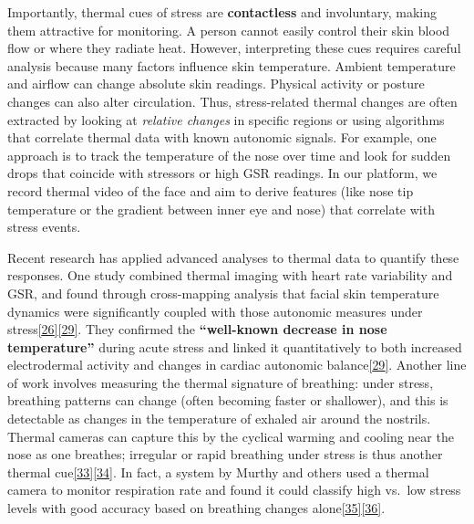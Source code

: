\documentclass[12pt,a4paper]{article}
\begin{document}
Importantly, thermal cues of stress are \textbf{contactless} and involuntary, making them attractive for monitoring. A person cannot easily control their skin blood flow or where they radiate heat. However, interpreting these cues requires careful analysis because many factors influence skin temperature. Ambient temperature and airflow can change absolute skin readings. Physical activity or posture changes can also alter circulation. Thus, stress-related thermal changes are often extracted by looking at \emph{relative changes} in specific regions or using algorithms that correlate thermal data with known autonomic signals. For example, one approach is to track the temperature of the nose over time and look for sudden drops that coincide with stressors or high GSR readings. In our platform, we record thermal video of the face and aim to derive features (like nose tip temperature or the gradient between inner eye and nose) that correlate with stress events.

Recent research has applied advanced analyses to thermal data to quantify these responses. One study combined thermal imaging with heart rate variability and GSR, and found through cross-mapping analysis that facial skin temperature dynamics were significantly coupled with those autonomic measures under stress\href{https://pmc.ncbi.nlm.nih.gov/articles/PMC10385045/\#:~:text=Skin\%20temperature\%20reflects\%20the\%20Autonomic,CM}{{[}26{]}}\href{https://pmc.ncbi.nlm.nih.gov/articles/PMC10385045/\#:~:text=both\%20conditions\%2C\%20which\%20was\%20not,signals\%20significantly\%20varies\%20with\%20gender}{{[}29{]}}. They confirmed the \textbf{``well-known decrease in nose temperature''} during acute stress and linked it quantitatively to both increased electrodermal activity and changes in cardiac autonomic balance\href{https://pmc.ncbi.nlm.nih.gov/articles/PMC10385045/\#:~:text=both\%20conditions\%2C\%20which\%20was\%20not,signals\%20significantly\%20varies\%20with\%20gender}{{[}29{]}}. Another line of work involves measuring the thermal signature of breathing: under stress, breathing patterns can change (often becoming faster or shallower), and this is detectable as changes in the temperature of exhaled air around the nostrils. Thermal cameras can capture this by the cyclical warming and cooling near the nose as one breathes; irregular or rapid breathing under stress is thus another thermal cue\href{https://www.mdpi.com/2076-3417/10/8/2924\#:~:text=included\%20the\%20mobile\%20thermal\%20camera,dimensional\%20spectrogram\%20by}{{[}33{]}}\href{https://www.mdpi.com/2076-3417/10/8/2924\#:~:text=stress\%20,Then\%2C\%20the}{{[}34{]}}. In fact, a system by Murthy and others used a thermal camera to monitor respiration rate and found it could classify high vs.~low stress levels with good accuracy based on breathing changes alone\href{https://www.mdpi.com/2076-3417/10/8/2924\#:~:text=included\%20the\%20mobile\%20thermal\%20camera,Then\%2C\%20the}{{[}35{]}}\href{https://www.mdpi.com/2076-3417/10/8/2924\#:~:text=controlled\%20by\%20the\%20ANS\%2C\%20its,level\%20stress\%29.\%20The}{{[}36{]}}.
\end{document}
